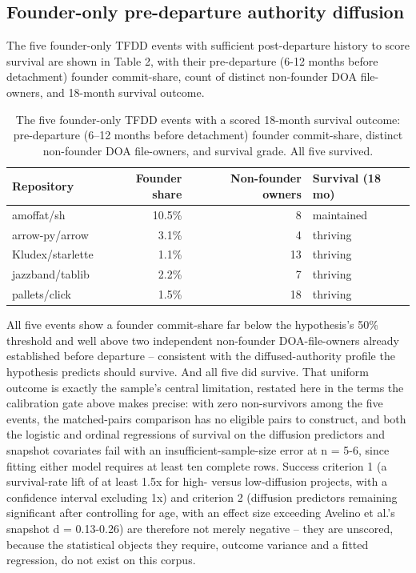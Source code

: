 \documentclass[11pt,letterpaper]{article}
\begin{document}
\subsection{Founder-only pre-departure authority diffusion}

The five founder-only TFDD events with sufficient post-departure history to score survival are shown in Table 2, with their pre-departure (6-12 months before detachment) founder commit-share, count of distinct non-founder DOA file-owners, and 18-month survival outcome.

\begin{table}[t]
\centering
\small
\caption{The five founder-only TFDD events with a scored 18-month survival outcome: pre-departure (6--12 months before detachment) founder commit-share, distinct non-founder DOA file-owners, and survival grade. All five survived.}
\label{tab:diffusion}
\begin{tabular}{lrrl}
\toprule
Repository & Founder share & Non-founder owners & Survival (18 mo) \\
\midrule
amoffat/sh & 10.5\% & 8 & maintained \\
arrow-py/arrow & 3.1\% & 4 & thriving \\
Kludex/starlette & 1.1\% & 13 & thriving \\
jazzband/tablib & 2.2\% & 7 & thriving \\
pallets/click & 1.5\% & 18 & thriving \\
\bottomrule
\end{tabular}
\end{table}

All five events show a founder commit-share far below the hypothesis's 50\% threshold and well above two independent non-founder DOA-file-owners already established before departure -- consistent with the diffused-authority profile the hypothesis predicts should survive. And all five did survive. That uniform outcome is exactly the sample's central limitation, restated here in the terms the calibration gate above makes precise: with zero non-survivors among the five events, the matched-pairs comparison has no eligible pairs to construct, and both the logistic and ordinal regressions of survival on the diffusion predictors and snapshot covariates fail with an insufficient-sample-size error at n = 5-6, since fitting either model requires at least ten complete rows. Success criterion 1 (a survival-rate lift of at least 1.5x for high- versus low-diffusion projects, with a confidence interval excluding 1x) and criterion 2 (diffusion predictors remaining significant after controlling for age, with an effect size exceeding Avelino et al.'s snapshot d = 0.13-0.26) are therefore not merely negative -- they are unscored, because the statistical objects they require, outcome variance and a fitted regression, do not exist on this corpus.
\end{document}
